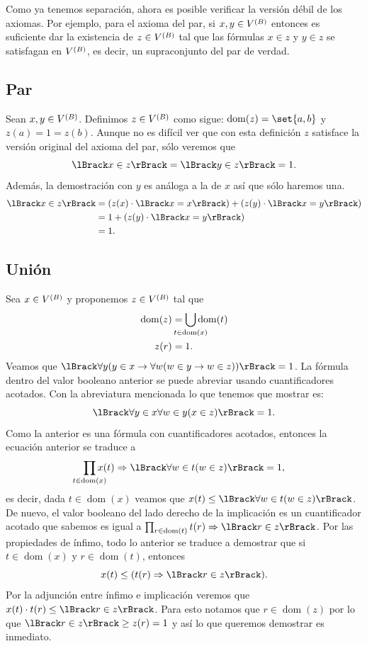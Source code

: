 \documentclass[letterpaper,DIV=15,12pt]{scrartcl}
\theoremstyle{manual}
\DeclarePairedDelimiter{\vb}{\lBrack}{\rBrack}             %
\DeclareMathOperator{\dom}{dom}                            %
\begin{document}
Como ya tenemos separación, ahora es posible verificar la versión débil de los
axiomas. Por ejemplo, para el axioma del par, si \(x,y\in\mb\) entonces es
suficiente dar la existencia de \(z\in\mb\) tal que las fórmulas \(x\in z\) y
\(y\in z\) se satisfagan en \(\mb\), es decir, un supraconjunto del par de
verdad. 


\subsection{Par}
Sean \(x,y\in\mb\). Definimos \(z\in\mb\) como sigue: \(\dom(z)=\set{a,b}\) y
\(z(a)=1=z(b)\). Aunque no es difícil ver que con esta definición \(z\)
satisface la versión original del axioma del par, sólo veremos que 
\begin{equation*}
  \vb{x\in z}=\vb{y\in z}=1.
\end{equation*}
Además, la demostración con \(y\) es análoga a la de \(x\) así que sólo haremos
una.
\begin{align*}
  \vb{x\in z} &= (z(x)\cdot\vb{x=x})+(z(y)\cdot\vb{x=y})\\
  &= 1 + (z(y)\cdot\vb{x=y})\\
  &=1.
\end{align*}


\subsection{Unión}
Sea \(x\in\mb\) y proponemos \(z\in\mb\) tal que
\begin{align*}
  \dom(z) &= \smashoperator{\bigcup_{t\in\dom(x)}}\dom(t)\\
  z(r) &= 1.
\end{align*}
Veamos que \(\vb{\forall y(y\in x\to \forall w(w\in y\to w\in z))}=1\). La
fórmula dentro del valor booleano anterior se puede abreviar usando
cuantificadores acotados. Con la abreviatura mencionada lo que tenemos que
mostrar es:
\begin{equation*}
  \vb{\forall y\in x\forall w\in y(x\in z)}=1.
\end{equation*}
Como la anterior es una fórmula con cuantificadores acotados, entonces la
ecuación anterior se traduce a
\begin{equation*}
  \smashoperator{\prod_{t\in\dom(x)}} x(t)\Rightarrow\vb{\forall w\in t(w\in z)}=1,
\end{equation*}
es decir, dada \(t\in\dom(x)\) veamos que 
\(x(t)\leq\vb{\forall w\in t(w\in z)}\). De nuevo, el valor booleano del lado
derecho de la implicación es un cuantificador acotado que sabemos es igual a
\(\prod_{r\in\dom(t)}t(r)\Rightarrow\vb{r\in z}\). Por las propiedades de
ínfimo, todo lo anterior se traduce a demostrar que si \(t\in\dom(x)\) y
\(r\in\dom(t)\), entonces
\begin{equation*}
  x(t)\leq (t(r)\Rightarrow\vb{r\in z}).
\end{equation*}
Por la adjunción entre ínfimo e implicación veremos que 
\(x(t)\cdot t(r)\leq\vb{r\in z}\). Para esto notamos que \(r\in\dom(z)\) por lo
que \(\vb{r\in z}\geq z(r)=1\) y así lo que queremos demostrar es inmediato.
\end{document}
